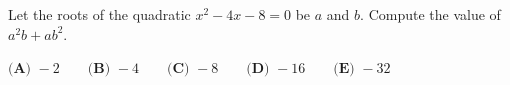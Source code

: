 Let the roots of the quadratic $x^2-4x-8=0$ be $a$ and $b$. Compute the value of $a^2b+ab^2$.

$\textbf{(A) }-2\qquad\textbf{(B) }-4\qquad\textbf{(C) }-8\qquad\textbf{(D) }-16\qquad\textbf{(E) }-32$
